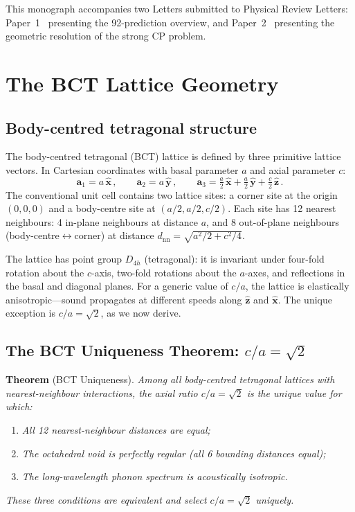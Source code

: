 \documentclass[review,number,sort&compress]{elsarticle}
\begin{document}
This monograph accompanies two Letters submitted to Physical Review
Letters: Paper~1~\cite{BCTletter} presenting the 92-prediction overview,
and Paper~2~\cite{BCTstrongCP} presenting the geometric resolution of
the strong CP problem.


\section{The BCT Lattice Geometry}
\label{sec:lattice_geometry}

\subsection{Body-centred tetragonal structure}

The body-centred tetragonal (BCT) lattice is defined by three
primitive lattice vectors. In Cartesian coordinates with basal parameter
$a$ and axial parameter $c$:
\begin{equation}
  \bm{a}_1 = a\,\hat{\bm{x}}\,,\qquad
  \bm{a}_2 = a\,\hat{\bm{y}}\,,\qquad
  \bm{a}_3 = \tfrac{a}{2}\,\hat{\bm{x}}
  + \tfrac{a}{2}\,\hat{\bm{y}}
  + \tfrac{c}{2}\,\hat{\bm{z}}\,.
  \label{eq:lattice_vectors}
\end{equation}
The conventional unit cell contains two lattice sites: a corner site at
the origin $(0,0,0)$ and a body-centre site at $(a/2, a/2, c/2)$.
Each site has 12 nearest neighbours: 4 in-plane neighbours at distance
$a$, and 8 out-of-plane neighbours (body-centre$\leftrightarrow$corner)
at distance $d_{\mathrm{nn}} = \sqrt{a^2/2 + c^2/4}$.

The lattice has point group $D_{4h}$ (tetragonal): it is invariant under
four-fold rotation about the $c$-axis, two-fold rotations about the
$a$-axes, and reflections in the basal and diagonal planes. For a generic
value of $c/a$, the lattice is elastically anisotropic---sound propagates
at different speeds along $\hat{\bm{z}}$ and $\hat{\bm{x}}$. The
unique exception is $c/a = \sqrt{2}$, as we now derive.

\subsection{The BCT Uniqueness Theorem: $c/a = \sqrt{2}$}
\label{sec:uniqueness}

\noindent\textbf{Theorem} (BCT Uniqueness).
\textit{Among all body-centred tetragonal lattices with nearest-neighbour
interactions, the axial ratio $c/a = \sqrt{2}$ is the unique value for
which:}
\begin{enumerate}
\item[(i)] \textit{All 12 nearest-neighbour distances are equal;}
\item[(ii)] \textit{The octahedral void is perfectly regular
  (all 6 bounding distances equal);}
\item[(iii)] \textit{The long-wavelength phonon spectrum is
  acoustically isotropic.}
\end{enumerate}
\textit{These three conditions are equivalent and select $c/a = \sqrt{2}$
uniquely.}
\end{document}
